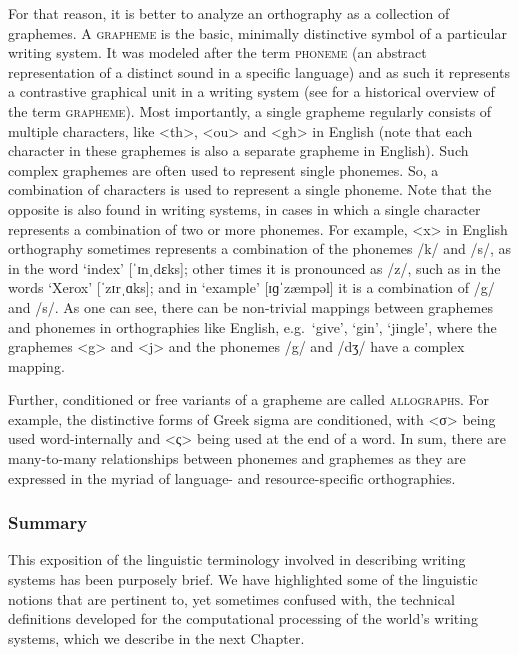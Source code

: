 For that reason, it is better to analyze an orthography as a collection of
graphemes. A \textsc{grapheme} is the basic, minimally distinctive symbol of a
particular writing system. It was modeled
after the term \textsc{phoneme} (an abstract representation of
a distinct sound in a specific language) and as such it represents a contrastive graphical unit in a
writing system (see \citealp{Kohrt1986} for a historical overview of the term
\textsc{grapheme}). Most importantly, a single grapheme regularly consists of multiple
characters, like <th>, <ou> and <gh> in English (note that each character in
these graphemes is also a separate grapheme in English). Such complex graphemes
are often used to represent single phonemes. So, a combination of characters is
used to represent a single phoneme. Note that the opposite is also found in
writing systems, in cases in which a single character represents a combination
of two or more phonemes. For example, <x> in English orthography sometimes represents a
combination of the phonemes /k/ and /s/, as in the word `index' [ˈɪnˌdɛks]; other times 
it is pronounced as /z/, such as in the words `Xerox' [ˈzɪrˌɑks]; and in `example' [ɪɡˈzæmpəl] 
it is a combination of /g/ and /s/. As one can see, there can be non-trivial mappings between graphemes and phonemes in 
orthographies like English, e.g.\ `give', `gin', `jingle', where the graphemes 
<g> and <j> and the phonemes /g/ and /dʒ/ have a complex mapping.

Further, conditioned or free variants of a grapheme are called
\textsc{allographs}. For example, the distinctive forms of Greek sigma are
conditioned, with <σ> being used word-internally and <ς> being used at the end
of a word. In sum, there are many-to-many relationships between phonemes and
graphemes as they are expressed in the myriad of language- and resource-specific
orthographies.

\subsubsection*{Summary}

\noindent This exposition of the linguistic terminology involved in describing writing
systems has been purposely brief. We have highlighted some of the linguistic
notions that are pertinent to, yet sometimes confused with, the technical
definitions developed for the computational processing of the world's writing
systems, which we describe in the next Chapter.


